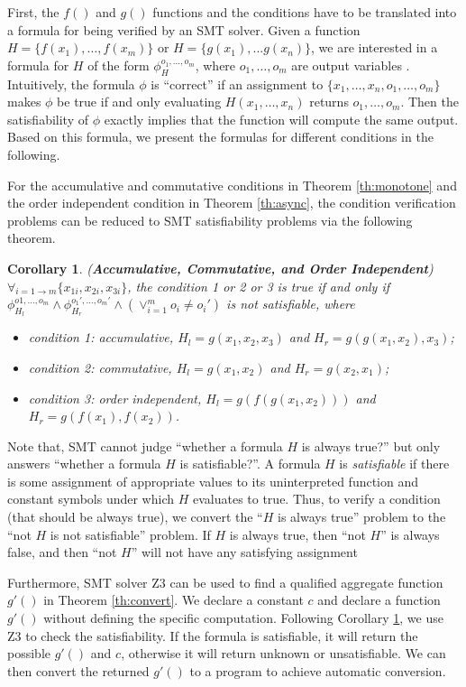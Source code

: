 First, the $f()$ and $g()$ functions and the conditions have to be translated into a formula for being verified by an SMT solver. Given a function $H=\{f(x_1),\ldots,f(x_m)\}$ or $H=\{g(x_1),...g(x_n)\}$, we are interested in a formula for $H$ of the form $\phi_H^{o_1,\ldots,o_m}$, where $o_1,\ldots,o_m$ are output variables \cite{Liu:2014:ADP:2670979.2670980}. Intuitively, the formula $\phi$ is ``correct'' if an assignment to $\{x_1,\ldots,x_n,o_1,\ldots,o_m\}$ makes $\phi$ be true if and only evaluating $H(x_1,\ldots,x_n)$ returns $o_1,\ldots,o_m$. Then the satisfiability of $\phi$ exactly implies that the function will compute the same output. Based on this formula, we present the formulas for different conditions in the following.

For the accumulative and commutative conditions in Theorem \ref{th:monotone} and the order independent condition in Theorem \ref{th:async}, the condition verification problems can be reduced to SMT satisfiability problems via the following theorem.

\newtheorem{corollary}{Corollary}
\begin{corollary}
	\label{coro:auto:1}
	(\textbf{Accumulative, Commutative, and Order Independent}) $\forall_{i=1\to m} \{x_{1i},x_{2i},x_{3i}\}$, the condition 1 or 2 or 3 is true if and only if $\phi_{H_l}^{o1,\ldots,o_m}\wedge \phi_{H_r}^{o_1',\ldots,o_m'}\wedge (\vee_{i=1}^m{o_i\neq o_i'})$ is not satisfiable, where
	\begin{itemize}
		\item condition 1: accumulative, $H_l=g(x_1,x_2,x_3)$ and $H_r=g(g(x_1,x_2),x_3)$;
		\item condition 2: commutative, $H_l=g(x_1,x_2)$ and $H_r=g(x_2,x_1)$;
		\item condition 3: order independent, $H_l=g(f(g(x_1,x_2)))$ and $H_r=g(f(x_1),f(x_2))$.
	\end{itemize}
\end{corollary}

Note that, SMT cannot judge ``whether a formula $H$ is always true?'' but only answers ``whether a formula $H$ is satisfiable?''. A formula $H$ is \emph{satisfiable} if there is some assignment of appropriate values to its uninterpreted function and constant symbols under which $H$ evaluates to true. Thus, to verify a condition (that should be always true), we convert the ``$H$ is always true'' problem to the ``not $H$ is not satisfiable'' problem. If $H$ is always true, then ``not $H$'' is always false, and then ``not $H$'' will not have any satisfying assignment


Furthermore, SMT solver Z3 can be used to find a qualified aggregate function $g'()$ in Theorem \ref{th:convert}. We declare a constant $c$ and declare a function $g'()$ without defining the specific computation. Following Corollary \ref{coro:auto:1}, we use Z3 to check the satisfiability. If the formula is satisfiable, it will return the possible $g'()$ and $c$, otherwise it will return unknown or unsatisfiable. We can then convert the returned $g'()$ to a program to achieve automatic conversion.
